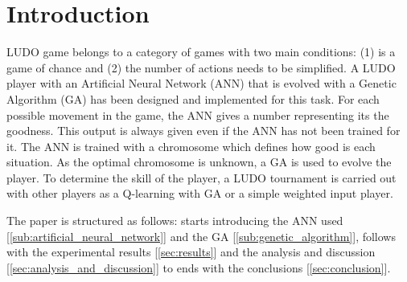 \section{Introduction}
\label{sec:introduction}
LUDO game belongs to a category of games with two main conditions: (1) is a game of chance and (2) the number of actions needs to be simplified. 
A LUDO player with an Artificial Neural Network (ANN) that is evolved with a Genetic Algorithm (GA) has been designed and implemented for this task. 
For each possible movement in the game, the ANN gives a number representing its the goodness.
This output is always given even if the ANN has not been trained for it.
The ANN is trained with a chromosome which defines how good is each situation.
As the optimal chromosome is unknown, a GA is used to evolve the player.
To determine the skill of the player, a LUDO tournament is carried out with other players as a Q-learning with GA or a simple weighted input player.

The paper is structured as follows: starts introducing the ANN used [\ref{sub:artificial_neural_network}] and the GA [\ref{sub:genetic_algorithm}], follows with the experimental results [\ref{sec:results}] and the analysis and discussion [\ref{sec:analysis_and_discussion}] to ends with the conclusions [\ref{sec:conclusion}].